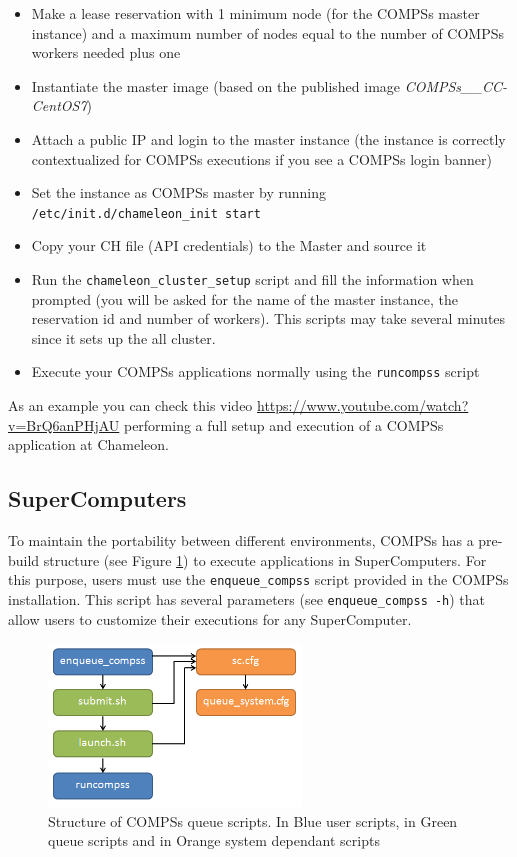 \begin{itemize}
 \item Make a lease reservation with 1 minimum node (for the COMPSs master instance) and a maximum number of nodes equal to the
 number of COMPSs workers needed plus one
 \item Instantiate the master image (based on the published image \textit{COMPSs\_\compssversion\_CC-CentOS7})
 \item Attach a public IP and login to the master instance (the instance is correctly contextualized for COMPSs executions if you
 see a COMPSs login banner)
 \item Set the instance as COMPSs master by running \texttt{/etc/init.d/chameleon\_init start}
 \item Copy your CH file (API credentials) to the Master and source it
 \item Run the \texttt{chameleon\_cluster\_setup} script and fill the information when prompted (you will be asked for the name of the
 master instance, the reservation id and number of workers). This scripts may take several minutes since it sets up the all cluster.
 \item Execute your COMPSs applications normally using the \texttt{runcompss} script
\end{itemize}

As an example you can check this video \url{https://www.youtube.com/watch?v=BrQ6anPHjAU} performing a full setup and 
execution of a COMPSs application at Chameleon.


\subsection{SuperComputers}

To maintain the portability between different environments, COMPSs has a pre-build structure (see Figure 
\ref{fig:queue_scripts_structure}) to execute applications in SuperComputers. For this purpose, users must use 
the \texttt{enqueue\_compss} script provided in the COMPSs installation. This script has several parameters (see 
\texttt{enqueue\_compss -h}) that allow users to customize their executions for any SuperComputer.

\begin{figure}[h!]
  \centering
    \includegraphics[width=0.6\textwidth]{./Sections/5_Execution_Platforms/Figures/queue_scripts_structure.png}
    \caption{Structure of COMPSs queue scripts. In Blue user scripts, in Green queue scripts and in Orange system dependant scripts}
    \label{fig:queue_scripts_structure}
\end{figure}

